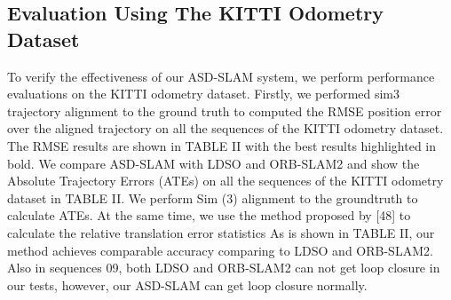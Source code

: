 \documentclass[letterpaper, 10 pt, conference]{ieeeconf}  %
\begin{document}
\subsection{Evaluation Using The KITTI Odometry Dataset}
To verify the effectiveness of our ASD-SLAM system, we perform performance evaluations on the KITTI odometry dataset. Firstly, we performed sim3 trajectory alignment to the ground truth to computed the RMSE position error over the aligned trajectory on all the sequences of the KITTI odometry dataset. The RMSE results are shown in TABLE II with the best results highlighted in bold.
We compare ASD-SLAM with LDSO and ORB-SLAM2 and show the Absolute Trajectory Errors (ATEs) on all the sequences of the KITTI odometry dataset in TABLE II. We perform Sim (3) alignment to the groundtruth to calculate ATEs. At the same time, we use the method proposed by [48] to calculate the relative translation error statistics   As is shown in TABLE II, our method achieves comparable accuracy comparing to LDSO and ORB-SLAM2. Also in sequences 09, both LDSO and ORB-SLAM2 can not get loop closure in our tests, however, our ASD-SLAM can get loop closure normally.
\end{document}
